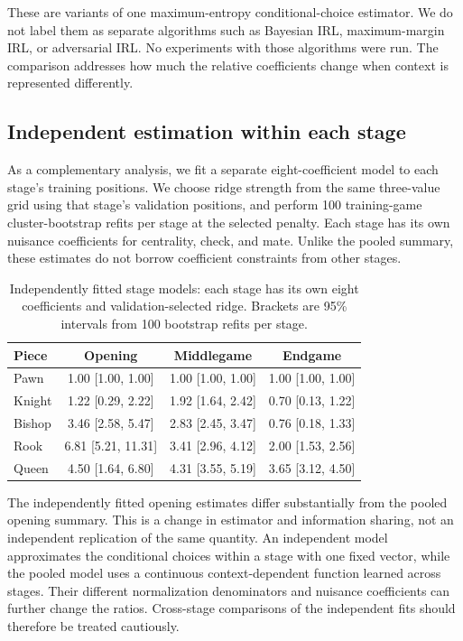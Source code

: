 \documentclass[11pt]{article}
\begin{document}
These are variants of one maximum-entropy conditional-choice estimator. We do not label them as separate algorithms such as Bayesian IRL, maximum-margin IRL, or adversarial IRL. No experiments with those algorithms were run. The comparison addresses how much the relative coefficients change when context is represented differently.

\subsection{Independent estimation within each stage}
As a complementary analysis, we fit a separate eight-coefficient model to each stage's training positions. We choose ridge strength from the same three-value grid using that stage's validation positions, and perform 100 training-game cluster-bootstrap refits per stage at the selected penalty. Each stage has its own nuisance coefficients for centrality, check, and mate. Unlike the pooled summary, these estimates do not borrow coefficient constraints from other stages.
\begin{table}[htbp]\centering
\small
\caption{Independently fitted stage models: each stage has its own eight coefficients and validation-selected ridge. Brackets are 95\% intervals from 100 bootstrap refits per stage.}\label{tab:independent}
\begin{tabular}{lccc}
\toprule
Piece & Opening & Middlegame & Endgame\\\midrule
Pawn & 1.00 [1.00, 1.00] & 1.00 [1.00, 1.00] & 1.00 [1.00, 1.00]\\
Knight & 1.22 [0.29, 2.22] & 1.92 [1.64, 2.42] & 0.70 [0.13, 1.22]\\
Bishop & 3.46 [2.58, 5.47] & 2.83 [2.45, 3.47] & 0.76 [0.18, 1.33]\\
Rook & 6.81 [5.21, 11.31] & 3.41 [2.96, 4.12] & 2.00 [1.53, 2.56]\\
Queen & 4.50 [1.64, 6.80] & 4.31 [3.55, 5.19] & 3.65 [3.12, 4.50]\\
\bottomrule\end{tabular}\end{table}

The independently fitted opening estimates differ substantially from the pooled opening summary. This is a change in estimator and information sharing, not an independent replication of the same quantity. An independent model approximates the conditional choices within a stage with one fixed vector, while the pooled model uses a continuous context-dependent function learned across stages. Their different normalization denominators and nuisance coefficients can further change the ratios. Cross-stage comparisons of the independent fits should therefore be treated cautiously.
\end{document}
